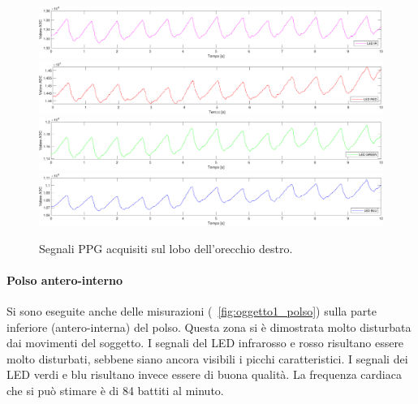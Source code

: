 \begin{figure}[h]
	\centering
	\includegraphics[width=1\linewidth]{ImageFiles/Misure Preliminari/Soggetto 1/lobo_ired}
	\includegraphics[width=1\linewidth]{ImageFiles/Misure Preliminari/Soggetto 1/lobo_red}
	\includegraphics[width=1\linewidth]{ImageFiles/Misure Preliminari/Soggetto 1/lobo_green}
	\includegraphics[width=1\linewidth]{ImageFiles/Misure Preliminari/Soggetto 1/lobo_blu}
	\caption{Segnali PPG acquisiti sul lobo dell'orecchio destro.}
	\label{fig:soggetto1_lobo}
\end{figure}

\clearpage

\paragraph{Polso antero-interno}

Si sono eseguite anche delle misurazioni (\Fig~\ref{fig:oggetto1_polso}) sulla parte inferiore (antero-interna) del polso. Questa zona si è dimostrata molto disturbata dai movimenti del soggetto. I segnali del LED infrarosso e rosso risultano essere molto disturbati, sebbene siano ancora visibili i picchi caratteristici. I segnali dei LED verdi e blu risultano invece essere di buona qualità. La frequenza cardiaca che si può stimare è di 84 battiti al minuto. 

